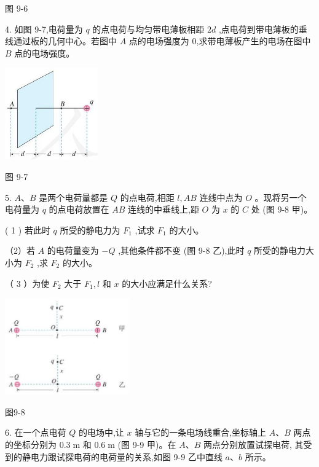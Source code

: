 \documentclass[10pt]{article}
\begin{document}
图 9-6

4. 如图 9-7,电荷量为 \(q\) 的点电荷与均匀带电薄板相距 \({2d}\) ,点电荷到带电薄板的垂线通过板的几何中心。若图中 \(A\) 点的电场强度为 0,求带电薄板产生的电场在图中 \(B\) 点的电场强度。

\begin{center}
\includegraphics[max width=0.3\textwidth]{images/01911d5f-8e38-70c0-b5b8-2b399bd115b6_29_630517.jpg}
\end{center}

图 9-7

5. \(A\text{、}B\) 是两个电荷量都是 \(Q\) 的点电荷,相距 \(l,{AB}\) 连线中点为 \(O\) 。现将另一个电荷量为 \(q\) 的点电荷放置在 \({AB}\) 连线的中垂线上,距 \(O\) 为 \(x\) 的 \(C\) 处 (图 9-8 甲)。

( 1 ) 若此时 \(q\) 所受的静电力为 \({F}_{1}\) ,试求 \({F}_{1}\) 的大小。

（2）若 \(A\) 的电荷量变为 \(- Q\) ,其他条件都不变 (图 9-8 乙),此时 \(q\) 所受的静电力大小为 \({F}_{2}\) ,求 \({F}_{2}\) 的大小。

（ 3 ）为使 \({F}_{2}\) 大于 \({F}_{1},l\) 和 \(x\) 的大小应满足什么关系?

\begin{center}
\includegraphics[max width=0.4\textwidth]{images/01911d5f-8e38-70c0-b5b8-2b399bd115b6_29_345169.jpg}
\end{center}

图9-8

6. 在一个点电荷 \(Q\) 的电场中,让 \(x\) 轴与它的一条电场线重合,坐标轴上 \(A\text{、}B\) 两点的坐标分别为 \({0.3}\mathrm{\;m}\) 和 \({0.6}\mathrm{\;m}\) (图 9-9 甲)。在 \(A\text{、}B\) 两点分别放置试探电荷, 其受到的静电力跟试探电荷的电荷量的关系,如图 9-9 乙中直线 \(a\text{、}b\) 所示。
\end{document}
